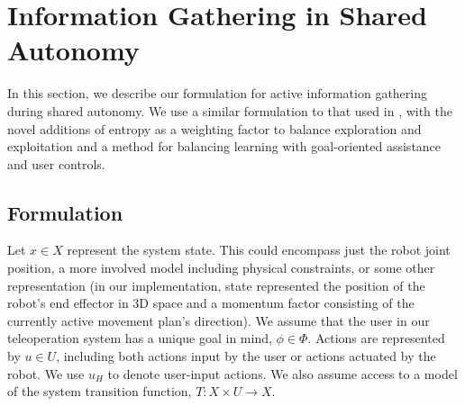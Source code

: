 \documentclass[conference]{IEEEtran}
\begin{document}
\section{Information Gathering in Shared Autonomy}\label{formulation}

In this section, we describe our formulation for active information gathering during shared autonomy. We use a similar formulation to that used in \cite{sadigh2016information, sadigh2018planning}, with the novel additions of entropy as a weighting factor to balance exploration and exploitation and a method for balancing learning with goal-oriented assistance and user controls.

\subsection{Formulation}

Let $ x \in X $ represent the system state. This could encompass just the robot joint position, a more involved model including physical constraints, or some other representation (in our implementation, state represented the position of the robot's end effector in 3D space and a momentum factor consisting of the currently active movement plan's direction). We assume that the user in our teleoperation system has a unique goal in mind, $\phi \in \Phi$. Actions are represented by $ u \in U $, including both actions input by the user or actions actuated by the robot. We use $u_H$ to denote user-input actions. We also assume access to a model of the system transition function, $T: X \times U \rightarrow X$.
\end{document}
